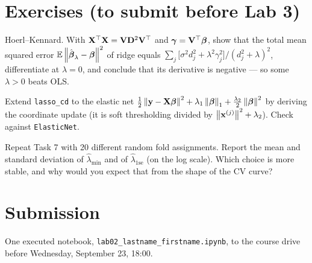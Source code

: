 \documentclass[11pt]{article}
\begin{document}
\section{Exercises (to submit before Lab 3)}
\begin{exercise}
Hoerl--Kennard. With $\mathbf{X}^{\top}\mathbf{X}=\mathbf{V}\mathbf{D}^2\mathbf{V}^{\top}$ and $\boldsymbol{\gamma}=\mathbf{V}^{\top}\boldsymbol{\beta}$, show that the total mean squared error
$\mathbb{E}\left\lVert \hat{\boldsymbol{\beta}}_\lambda-\boldsymbol{\beta} \right\rVert^2$ of ridge equals
$\sum_j\bigl[\sigma^2d_j^2+\lambda^2\gamma_j^2\bigr]/(d_j^2+\lambda)^2$, differentiate at $\lambda=0$, and
conclude that its derivative is negative --- so some $\lambda>0$ beats OLS.
\end{exercise}
\begin{exercise}
Extend \texttt{lasso\_cd} to the elastic net $\frac12\left\lVert \mathbf{y}-\mathbf{X}\boldsymbol{\beta} \right\rVert^2+\lambda_1\left\lVert \boldsymbol{\beta} \right\rVert_1+\frac{\lambda_2}{2}\left\lVert \boldsymbol{\beta} \right\rVert^2$
by deriving the coordinate update (it is soft thresholding divided by $\left\lVert \mathbf{x}^{(j)} \right\rVert^2+\lambda_2$).
Check against \texttt{ElasticNet}.
\end{exercise}
\begin{exercise}
Repeat Task 7 with 20 different random fold assignments. Report the mean and standard deviation of
$\hat\lambda_{\min}$ and of $\hat\lambda_{1\text{se}}$ (on the log scale). Which choice is more stable, and why
would you expect that from the shape of the CV curve?
\end{exercise}

\section*{Submission}
One executed notebook, \texttt{lab02\_lastname\_firstname.ipynb}, to the course drive before
Wednesday, September 23, 18:00.
\end{document}
